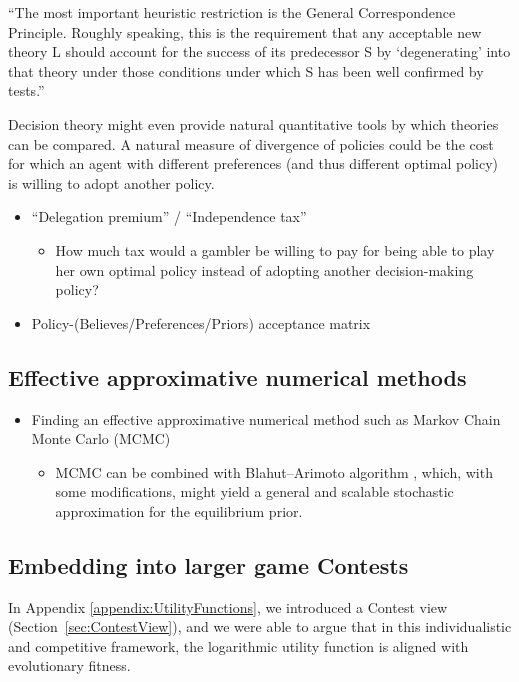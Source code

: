\documentclass{article}
\theoremstyle{definition}
\begin{document}
``The most important heuristic restriction is the General Correspondence Principle. Roughly speaking, this is the requirement that any acceptable new theory L should account for the success of its predecessor S by ‘degenerating’ into that theory under those conditions under which S has been well confirmed by tests.'' \cite{book:CorrespondencePost}

Decision theory might even provide natural quantitative tools by which theories can be compared. A natural measure of divergence of policies could be the cost for which an agent with different preferences (and thus different optimal policy) is willing to adopt another policy.

\begin{itemize}
    \item ``Delegation premium'' / ``Independence tax''
    \begin{itemize}
        \item How much tax would a gambler be willing to pay for being able to play her own optimal policy instead of adopting another decision-making policy?
    \end{itemize}
    \item Policy-(Believes/Preferences/Priors) acceptance matrix
\end{itemize}

\subsection{Effective approximative numerical methods}

\begin{itemize}
    \item Finding an effective approximative numerical method such as Markov Chain Monte Carlo (MCMC) \cite{book:MCMC}
    \begin{itemize}
        \item MCMC can be combined with Blahut–Arimoto algorithm \cite{paper:MCMCBlahutArimoto,arxiv:MCMCBlahutArimoto}, which, with some modifications, might yield a general and scalable stochastic approximation for the equilibrium prior.
    \end{itemize}
\end{itemize}

\subsection{Embedding into larger game Contests}

In Appendix \ref{appendix:UtilityFunctions}, we introduced a Contest view (Section~\ref{sec:ContestView}), and we were able to argue that in this individualistic and competitive framework, the logarithmic utility function is aligned with evolutionary fitness.
\end{document}
